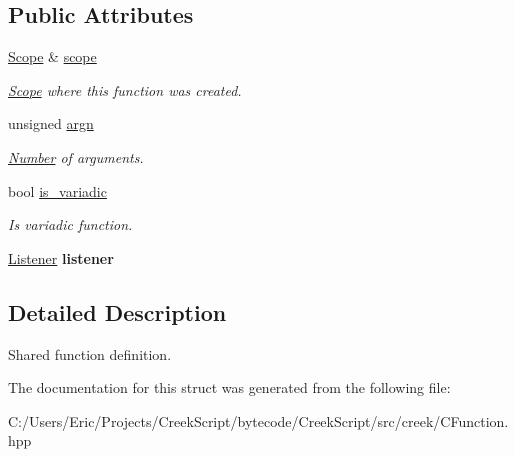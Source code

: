 \subsection*{Public Attributes}
\begin{DoxyCompactItemize}
\item 
\hyperlink{classcreek_1_1_scope}{Scope} \& \hyperlink{structcreek_1_1_c_function_1_1_definition_ac1d7e89ccc12df67aee1e672358f15b8}{scope}\hypertarget{structcreek_1_1_c_function_1_1_definition_ac1d7e89ccc12df67aee1e672358f15b8}{}\label{structcreek_1_1_c_function_1_1_definition_ac1d7e89ccc12df67aee1e672358f15b8}

\begin{DoxyCompactList}\small\item\em \hyperlink{classcreek_1_1_scope}{Scope} where this function was created. \end{DoxyCompactList}\item 
unsigned \hyperlink{structcreek_1_1_c_function_1_1_definition_a449a127660f382849f43dc4e0393f11a}{argn}\hypertarget{structcreek_1_1_c_function_1_1_definition_a449a127660f382849f43dc4e0393f11a}{}\label{structcreek_1_1_c_function_1_1_definition_a449a127660f382849f43dc4e0393f11a}

\begin{DoxyCompactList}\small\item\em \hyperlink{classcreek_1_1_number}{Number} of arguments. \end{DoxyCompactList}\item 
bool \hyperlink{structcreek_1_1_c_function_1_1_definition_ac6af72ba5a693e411f25c9617e370cad}{is\+\_\+variadic}\hypertarget{structcreek_1_1_c_function_1_1_definition_ac6af72ba5a693e411f25c9617e370cad}{}\label{structcreek_1_1_c_function_1_1_definition_ac6af72ba5a693e411f25c9617e370cad}

\begin{DoxyCompactList}\small\item\em Is variadic function. \end{DoxyCompactList}\item 
\hyperlink{classcreek_1_1_c_function_a9499b5501ecc59d9ef8d892991c8fa16}{Listener} {\bfseries listener}\hypertarget{structcreek_1_1_c_function_1_1_definition_a86cb3ac7ca1d85f3ac6d26ec551687d2}{}\label{structcreek_1_1_c_function_1_1_definition_a86cb3ac7ca1d85f3ac6d26ec551687d2}

\end{DoxyCompactItemize}


\subsection{Detailed Description}
Shared function definition. 

The documentation for this struct was generated from the following file\+:\begin{DoxyCompactItemize}
\item 
C\+:/\+Users/\+Eric/\+Projects/\+Creek\+Script/bytecode/\+Creek\+Script/src/creek/C\+Function.\+hpp\end{DoxyCompactItemize}
